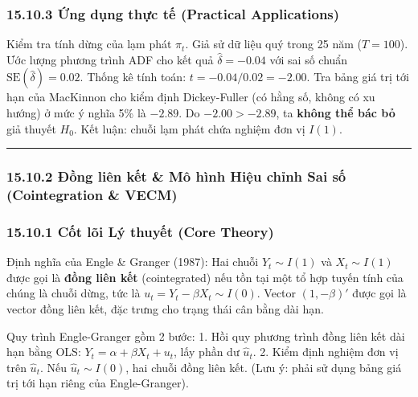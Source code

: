 \documentclass[
]{article}
\begin{document}
\subsubsection{15.10.3 Ứng dụng thực tế (Practical
Applications)}\label{ux1ee9ng-dux1ee5ng-thux1ef1c-tux1ebf-practical-applications-62}

Kiểm tra tính dừng của lạm phát \(\pi_t\). Giả sử dữ liệu quý trong 25
năm (\(T=100\)). Ước lượng phương trình ADF cho kết quả
\(\hat{\delta} = -0.04\) với sai số chuẩn
\(\text{SE}(\hat{\delta}) = 0.02\). Thống kê tính toán:
\(t = -0.04 / 0.02 = -2.00\). Tra bảng giá trị tới hạn của MacKinnon cho
kiểm định Dickey-Fuller (có hằng số, không có xu hướng) ở mức ý nghĩa
5\% là \(-2.89\). Do \(-2.00 > -2.89\), ta \textbf{không thể bác bỏ} giả
thuyết \(H_0\). Kết luận: chuỗi lạm phát chứa nghiệm đơn vị \(I(1)\).

\begin{center}\rule{0.5\linewidth}{0.5pt}\end{center}

\subsubsection{15.10.2 Đồng liên kết \& Mô hình Hiệu chỉnh Sai số
(Cointegration \&
VECM)}\label{ux111ux1ed3ng-liuxean-kux1ebft-muxf4-huxecnh-hiux1ec7u-chux1ec9nh-sai-sux1ed1-cointegration-vecm}

\subsubsection{15.10.1 Cốt lõi Lý thuyết (Core
Theory)}\label{cux1ed1t-luxf5i-luxfd-thuyux1ebft-core-theory-56}

Định nghĩa của Engle \& Granger (1987): Hai chuỗi \(Y_t \sim I(1)\) và
\(X_t \sim I(1)\) được gọi là \textbf{đồng liên kết} (cointegrated) nếu
tồn tại một tổ hợp tuyến tính của chúng là chuỗi dừng, tức là
\(u_t = Y_t - \beta X_t \sim I(0)\). Vector \((1, -\beta)'\) được gọi là
vector đồng liên kết, đặc trưng cho trạng thái cân bằng dài hạn.

Quy trình Engle-Granger gồm 2 bước: 1. Hồi quy phương trình đồng liên
kết dài hạn bằng OLS: \(Y_t = \alpha + \beta X_t + u_t\), lấy phần dư
\(\hat{u}_t\). 2. Kiểm định nghiệm đơn vị trên \(\hat{u}_t\). Nếu
\(\hat{u}_t \sim I(0)\), hai chuỗi đồng liên kết. (Lưu ý: phải sử dụng
bảng giá trị tới hạn riêng của Engle-Granger).
\end{document}
